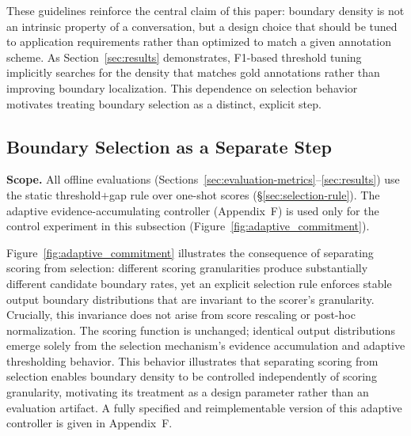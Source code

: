 \documentclass{article}
\begin{document}
These guidelines reinforce the central claim of this paper: boundary
density is not an intrinsic property of a conversation, but a design
choice that should be tuned to application requirements rather than
optimized to match a given annotation scheme. As
Section~\ref{sec:results} demonstrates, F1-based threshold tuning
implicitly searches for the density that matches gold annotations
rather than improving boundary localization. This dependence on
selection behavior motivates treating boundary selection as a
distinct, explicit step.

\subsection{Boundary Selection as a Separate Step}
\label{sec:boundary-selection}
\noindent\textbf{Scope.} All offline evaluations
(Sections~\ref{sec:evaluation-metrics}--\ref{sec:results}) use the
static threshold\(+\)gap rule over one-shot scores
(\S\ref{sec:selection-rule}). The adaptive evidence-accumulating
controller (Appendix~F) is used only for the control
experiment in this subsection (Figure~\ref{fig:adaptive_commitment}).

Figure~\ref{fig:adaptive_commitment} illustrates the consequence of
separating scoring from selection: different scoring granularities
produce substantially different candidate boundary rates, yet an
explicit selection rule enforces stable output boundary distributions
that are invariant to the scorer's granularity. Crucially, this
invariance does not arise from score rescaling or post-hoc
normalization. The scoring function is unchanged; identical output
distributions emerge solely from the selection mechanism's evidence
accumulation and adaptive thresholding behavior. This behavior
illustrates that separating scoring from selection enables boundary
density to be controlled independently of scoring granularity,
motivating its treatment as a design parameter rather than an
evaluation artifact. A fully specified and reimplementable version of
this adaptive controller is given in Appendix~F.
\end{document}

